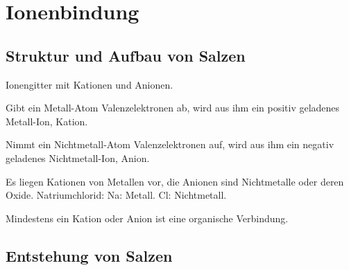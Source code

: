
\section{Ionenbindung}

\subsection{Struktur und Aufbau von Salzen}

Ionengitter mit Kationen und Anionen.

\begin{definition}[Kation]
	Gibt ein Metall-Atom Valenzelektronen ab, wird aus ihm ein positiv geladenes Metall-Ion, Kation.
\end{definition}

\begin{definition}[Anion]
	Nimmt ein Nichtmetall-Atom Valenzelektronen auf, wird aus ihm ein negativ geladenes Nichtmetall-Ion, Anion.
\end{definition}

\begin{definition}
	Es liegen Kationen von Metallen vor, die Anionen sind Nichtmetalle oder deren Oxide. Natriumchlorid: Na: Metall. Cl: Nichtmetall.
\end{definition}

\begin{definition}
	Mindestens ein Kation oder Anion ist eine organische Verbindung.
\end{definition}

\subsection{Entstehung von Salzen}

